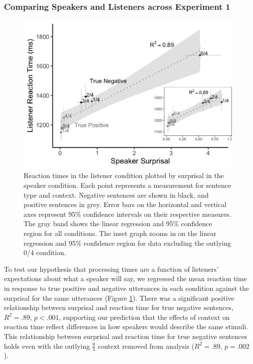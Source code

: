 \documentclass[man, floatsintext, noapacite]{apa6}
\begin{document}
\subsubsection{Comparing Speakers and Listeners across Experiment 1}

\begin{figure}[t]
\begin{center} 
\includegraphics[width=6in]{figures/experiment1/speaker_v_listener.png}
\caption{\label{fig:exp1_scatter} Reaction times in the listener condition plotted by surprisal in the speaker condition. Each point represents a measurement for sentence type and context. Negative sentences are shown in black, and positive sentences in grey. Error bars on the horizontal and vertical axes represent 95\% confidence intervals on their respective measures. The gray band shows the linear regression and  95\% confidence region for all conditions. The inset graph zooms in on the linear regression and 95\% confidence region for data excluding the outlying 0/4 condition.}
\end{center} 
\end{figure}

To test our hypothesis that processing times are a function of listeners' expectations about what a speaker will say, we regressed the mean reaction time in response to true positive and negative utterances in each condition against the surprisal for the same utterances (Figure \ref{fig:exp1_scatter}).  There was a significant positive relationship between surprisal and reaction time for true negative sentences, $R^2=.89$, $p<.001$, supporting our prediction that the effects of context on reaction time reflect differences in how speakers would describe the same stimuli. This relationship between surprisal and reaction time for true negative sentences holds even with the outlying $\frac{0}{4}$ context removed from analysis ($R^2=.89$, $p = .002$).
\end{document}
